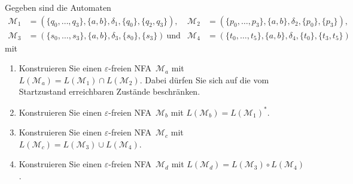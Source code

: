 \begin{exercise}
  Gegeben sind die Automaten
  \begin{align*}
     \mathcal{M}_1 &=(\{q_0,\dots,q_3\},\{a,b\},\delta_1,\{q_0\},\{q_2,q_3\}),
    &\mathcal{M}_2 &=(\{p_0,\dots,p_3\},\{a,b\},\delta_2,\{p_0\},\{p_3\}),\\
     \mathcal{M}_3 &=(\{s_0,\dots,s_3\},\{a,b\},\delta_3,\{s_0\},\{s_3\})\ \text{und}
    &\mathcal{M}_4 &=(\{t_0,\dots,t_5\},\{a,b\},\delta_4,\{t_0\},\{t_3,t_5\})
  \end{align*}
  mit

  \begin{center}
       
  \end{center}

  \vspace*{2ex}

  \begin{enumerate}
    \item Konstruieren Sie einen $\varepsilon$-freien NFA~$\mathcal{M}_a$ mit
      $L(\mathcal{M}_a)=L(\mathcal{M}_1)\cap L(\mathcal{M}_2)$.
      Dabei dürfen Sie sich auf die vom Startzustand erreichbaren Zustände
      beschränken.
    \item Konstruieren Sie einen $\varepsilon$-freien NFA~$\mathcal{M}_b$ mit
      $L(\mathcal{M}_b)=L(\mathcal{M}_1)^*$.
    \item Konstruieren Sie einen $\varepsilon$-freien NFA~$\mathcal{M}_c$ mit
      $L(\mathcal{M}_c)=L(\mathcal{M}_3)\cup L(\mathcal{M}_4)$.
    \item Konstruieren Sie einen $\varepsilon$-freien NFA~$\mathcal{M}_d$ mit
      $L(\mathcal{M}_d)=L(\mathcal{M}_3)\circ L(\mathcal{M}_4)$.
  \end{enumerate}
\end{exercise}



